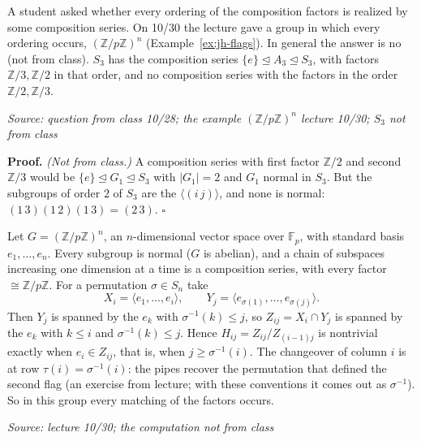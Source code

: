 \documentclass[11pt]{report}
\renewenvironment{proof}[1][Proof]{\noindent\textbf{#1.} }{\hfill$\square$\par\vspace{5pt}}
\newcommand{\srcline}[1]{\par\hfill{\footnotesize\textit{Source: #1}}}
\begin{document}
\begin{exbox}\label{ex:s3-composition-order}
A student asked whether every ordering of the composition factors is realized by some composition series. On 10/30 the lecture gave a group in which every ordering occurs, $(\mathbb{Z}/p\mathbb{Z})^n$ (Example~\ref{ex:jh-flags}). In general the answer is no (not from class). $S_3$ has the composition series $\{e\} \trianglelefteq A_3 \trianglelefteq S_3$, with factors $\mathbb{Z}/3, \mathbb{Z}/2$ in that order, and no composition series with the factors in the order $\mathbb{Z}/2, \mathbb{Z}/3$.
\srcline{question from class 10/28; the example $(\mathbb{Z}/p\mathbb{Z})^n$ lecture 10/30; $S_3$ not from class}
\end{exbox}

\begin{proof}
\textit{(Not from class.)} A composition series with first factor $\mathbb{Z}/2$ and second $\mathbb{Z}/3$ would be $\{e\} \trianglelefteq G_1 \trianglelefteq S_3$ with $|G_1| = 2$ and $G_1$ normal in $S_3$. But the subgroups of order $2$ of $S_3$ are the $\langle (i\,j) \rangle$, and none is normal: $(1\,3)(1\,2)(1\,3) = (2\,3)$.
\end{proof}

\begin{exbox}\label{ex:jh-flags}
Let $G = (\mathbb{Z}/p\mathbb{Z})^n$, an $n$-dimensional vector space over $\mathbb{F}_p$, with standard basis $e_1, \ldots, e_n$. Every subgroup is normal ($G$ is abelian), and a chain of subspaces increasing one dimension at a time is a composition series, with every factor $\cong \mathbb{Z}/p\mathbb{Z}$. For a permutation $\sigma \in S_n$ take
\[ X_i = \langle e_1, \ldots, e_i \rangle, \qquad Y_j = \langle e_{\sigma(1)}, \ldots, e_{\sigma(j)} \rangle . \]
Then $Y_j$ is spanned by the $e_k$ with $\sigma^{-1}(k) \leq j$, so $Z_{ij} = X_i \cap Y_j$ is spanned by the $e_k$ with $k \leq i$ and $\sigma^{-1}(k) \leq j$. Hence $H_{ij} = Z_{ij}/Z_{(i-1)j}$ is nontrivial exactly when $e_i \in Z_{ij}$, that is, when $j \geq \sigma^{-1}(i)$. The changeover of column $i$ is at row $\tau(i) = \sigma^{-1}(i)$: the pipes recover the permutation that defined the second flag (an exercise from lecture; with these conventions it comes out as $\sigma^{-1}$). So in this group every matching of the factors occurs.
\srcline{lecture 10/30; the computation not from class}
\end{exbox}
\end{document}
